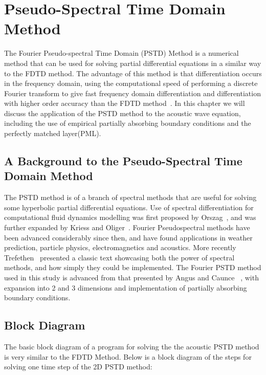 
\section{Pseudo-Spectral Time Domain Method}
The Fourier Pseudo-spectral Time Domain (PSTD) Method is a numerical method that can be used for solving partial differential equations in a similar way to the FDTD method. The advantage of this method is that differentiation occurs in the frequency domain, using the computational speed of performing a discrete Fourier transform to give fast frequency domain differentiation and differentiation with higher order accuracy than the FDTD method~\cite{Hornikx2016}. In this chapter we will discuss the application of the PSTD method to the acoustic wave equation, including the use of empirical partially absorbing boundary conditions and the perfectly matched layer(PML).

\subsection{A Background to the Pseudo-Spectral Time Domain Method}
The PSTD method is of a branch of spectral methods that are useful for solving some hyperbolic partial differential equations. Use of spectral differentiation for computational fluid dynamics modelling was first proposed by Orszag~\cite{Orszag1971}, and was further expanded by Kriess and Oliger~\cite{Kreiss1972}. Fourier Pseudospectral methods have been advanced considerably since then, and have found applications in weather prediction, particle physics, electromagnetics and acoustics. More recently Trefethen~\cite{Trefethen2000} presented a classic text showcasing both the power of spectral methods, and how simply they could be implemented. The Fourier PSTD method used in this study is advanced from that presented by Angus and Caunce ~\cite{Angus2010}, with expansion into 2 and 3 dimensions and implementation of partially absorbing boundary conditions. 

\subsection{Block Diagram}
The basic block diagram of a program for solving the the acoustic PSTD method is very similar to the FDTD Method. Below is a block diagram of the steps for solving one time step of the 2D PSTD method:\\

